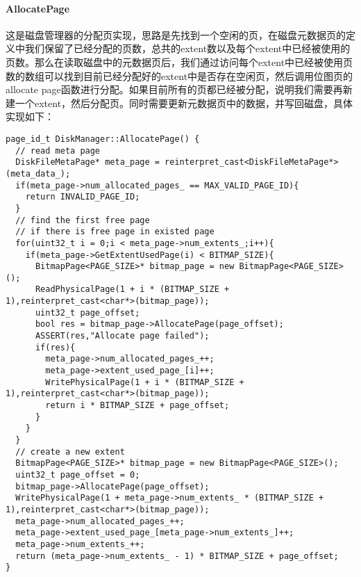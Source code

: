 \documentclass[12pt,hyperref,a4paper,UTF8]{ctexart}
\begin{document}
\paragraph{AllocatePage}

这是磁盘管理器的分配页实现，思路是先找到一个空闲的页，在磁盘元数据页的定义中我们保留了已经分配的页数，总共的extent数以及每个extent中已经被使用的页数。那么在读取磁盘中的元数据页后，我们通过访问每个extent中已经被使用页数的数组可以找到目前已经分配好的extent中是否存在空闲页，然后调用位图页的allocate page函数进行分配。如果目前所有的页都已经被分配，说明我们需要再新建一个extent，然后分配页。同时需要更新元数据页中的数据，并写回磁盘，具体实现如下：

\begin{verbatim}
page_id_t DiskManager::AllocatePage() {
  // read meta page
  DiskFileMetaPage* meta_page = reinterpret_cast<DiskFileMetaPage*>(meta_data_);
  if(meta_page->num_allocated_pages_ == MAX_VALID_PAGE_ID){
    return INVALID_PAGE_ID;
  }
  // find the first free page
  // if there is free page in existed page
  for(uint32_t i = 0;i < meta_page->num_extents_;i++){
    if(meta_page->GetExtentUsedPage(i) < BITMAP_SIZE){
      BitmapPage<PAGE_SIZE>* bitmap_page = new BitmapPage<PAGE_SIZE>();
      ReadPhysicalPage(1 + i * (BITMAP_SIZE + 1),reinterpret_cast<char*>(bitmap_page));
      uint32_t page_offset;
      bool res = bitmap_page->AllocatePage(page_offset);
      ASSERT(res,"Allocate page failed");
      if(res){
        meta_page->num_allocated_pages_++;
        meta_page->extent_used_page_[i]++;
        WritePhysicalPage(1 + i * (BITMAP_SIZE + 1),reinterpret_cast<char*>(bitmap_page));
        return i * BITMAP_SIZE + page_offset;
      }
    }
  }
  // create a new extent
  BitmapPage<PAGE_SIZE>* bitmap_page = new BitmapPage<PAGE_SIZE>();
  uint32_t page_offset = 0;
  bitmap_page->AllocatePage(page_offset);
  WritePhysicalPage(1 + meta_page->num_extents_ * (BITMAP_SIZE + 1),reinterpret_cast<char*>(bitmap_page));
  meta_page->num_allocated_pages_++;
  meta_page->extent_used_page_[meta_page->num_extents_]++;
  meta_page->num_extents_++;
  return (meta_page->num_extents_ - 1) * BITMAP_SIZE + page_offset;
}
\end{verbatim}
\end{document}
